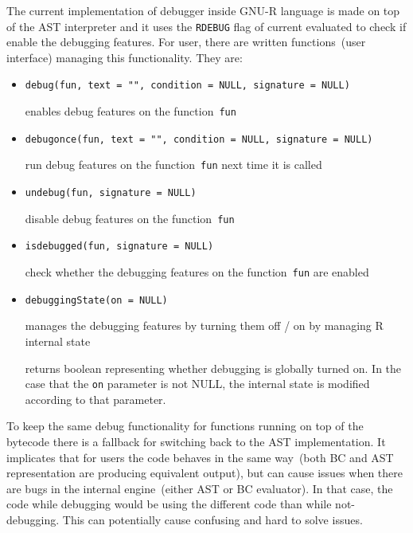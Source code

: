 \documentclass[thesis=M,english]{FITthesis}[2018/10/20]
\newcommand{\code}[1]{\texttt{#1}}
\begin{document}
The current implementation of debugger inside GNU-R language is made on top of the AST interpreter and it uses the \code{RDEBUG} flag of current evaluated to check if enable the debugging features. For user, there are written functions~(user interface) managing this functionality. They are:

\begin{itemize}
	\item \code{debug(fun, text = "", condition = NULL, signature = NULL)}

	\hspace*{6mm} enables debug features on the function~\code{fun}

	\item \code{debugonce(fun, text = "", condition = NULL, signature = NULL)}

	\hspace*{6mm} run debug features on the function~\code{fun} next time it is called

	\item \code{undebug(fun, signature = NULL)}

	\hspace*{6mm} disable debug features on the function~\code{fun}

	\item \code{isdebugged(fun, signature = NULL)}

	\hspace*{6mm} check whether the debugging features on the function~\code{fun} are enabled

	\item \code{debuggingState(on = NULL)}

	\hspace*{6mm} manages the debugging features by turning them off / on by managing R internal state

	\hspace*{6mm} returns boolean representing whether debugging is globally turned on. In the case that the \code{on} parameter is not NULL, the internal state is modified according to that parameter.

\end{itemize}

To keep the same debug functionality for functions running on top of the bytecode there is a fallback for switching back to the AST implementation. It implicates that for users the code behaves in the same way~(both BC and AST representation are producing equivalent output), but can cause issues when there are bugs in the internal engine~(either AST or BC evaluator). In that case, the code while debugging would be using the different code than while not-debugging. This can potentially cause confusing and hard to solve issues. 
\end{document}
